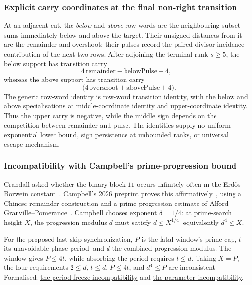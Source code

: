 \documentclass[11pt]{article}
\newcommand{\commit}{312b96c0d149ed466725c62d4ef24cfc91bca34e}
\newcommand{\repobase}{https://github.com/wcook04/plectis-lean-erdos249-257/blob/\commit}
\newcommand{\PK}{Erdos249257}
\newcommand{\lword}[4]{\href{\repobase/\PK/#1\#L#2}{#4}}
\theoremstyle{definition}
\theoremstyle{remark}
\begin{document}
{\subsubsection{Explicit carry coordinates at the final non-right transition}
\label{res:producercarrycoordinates}

At an adjacent cut, the \emph{below} and \emph{above} row words are the
neighbouring subset sums immediately below and above the target.  Their
unsigned distances from it are the remainder and overshoot; their pulses
record the paired divisor-incidence contribution of the next two rows.
After adjoining the terminal rank \(s\ge5\), the below support has transition
carry
\[
  4\,\mathrm{remainder}-\mathrm{belowPulse}-4,
\]
whereas the above support has transition carry
\[
  -\bigl(4\,\mathrm{overshoot}+\mathrm{abovePulse}+4\bigr).
\]
The generic row-word identity is
\lword{HalfCylinderProducerLowerBound.lean}{105}{producerCarry_insert_seamWordSupport_eq}{row-word transition identity},
with the below and above specialisations at
\lword{HalfCylinderProducerLowerBound.lean}{150}{producerCarry_insert_seamBelowSupport_eq_middleCoordinate}{middle-coordinate identity}
and
\lword{HalfCylinderProducerLowerBound.lean}{183}{producerCarry_insert_seamAboveSupport_eq_neg_upperCoordinate}{upper-coordinate identity}.
Thus the upper carry is negative, while the middle sign depends on the
competition between remainder and pulse.  The identities supply no uniform
exponential lower bound, sign persistence at unbounded ranks, or universal
escape mechanism.

\subsubsection{Incompatibility with Campbell's prime-progression bound}
\label{res:campbellboundary}

Crandall asked whether the binary block \(11\) occurs infinitely often in
the Erd\H{o}s--Borwein constant~\cite{crandall}.  Campbell's 2026 preprint
proves this affirmatively~\cite{campbell}, using a Chinese-remainder
construction and a prime-progression estimate of
Alford--Granville--Pomerance~\cite{alfordgranvillepomerance}.
Campbell chooses
exponent \(\delta=1/4\): at prime-search height \(X\), the progression
modulus \(d\) must satisfy \(d\le X^{1/4}\), equivalently \(d^4\le X\).

For the proposed last-skip synchronization, \(P\) is the fatal window's
prime cap, \(t\) its unavoidable phase period, and \(d\) the combined
progression modulus.  The window gives \(P\le4t\), while absorbing the
period requires \(t\le d\).  Taking \(X=P\), the four requirements
\(2\le d\), \(t\le d\), \(P\le4t\), and \(d^4\le P\) are inconsistent.
Formalised:
\lword{CampbellShiftSynchronization.lean}{299}{campbellQuarterExponent_periodFreeze_noSync}{the period-freeze incompatibility}
and
\lword{CampbellShiftSynchronization.lean}{320}{campbellPhaseFreeze_parameters_impossible}{the parameter incompatibility}.

}
\end{document}
